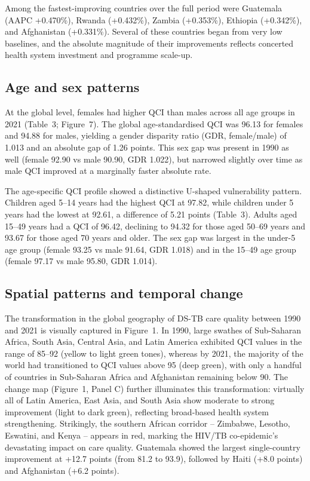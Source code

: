 \documentclass[12pt]{article}
\begin{document}
Among the fastest-improving countries over the full period were Guatemala (AAPC +0.470\%), Rwanda (+0.432\%), Zambia (+0.353\%), Ethiopia (+0.342\%), and Afghanistan (+0.331\%). Several of these countries began from very low baselines, and the absolute magnitude of their improvements reflects concerted health system investment and programme scale-up.

\subsection{Age and sex patterns}

At the global level, females had higher QCI than males across all age groups in 2021 (Table~3; Figure~7). The global age-standardised QCI was 96.13 for females and 94.88 for males, yielding a gender disparity ratio (GDR, female/male) of 1.013 and an absolute gap of 1.26 points. This sex gap was present in 1990 as well (female 92.90 vs male 90.90, GDR 1.022), but narrowed slightly over time as male QCI improved at a marginally faster absolute rate.

The age-specific QCI profile showed a distinctive U-shaped vulnerability pattern. Children aged 5--14 years had the highest QCI at 97.82, while children under 5 years had the lowest at 92.61, a difference of 5.21 points (Table~3). Adults aged 15--49 years had a QCI of 96.42, declining to 94.32 for those aged 50--69 years and 93.67 for those aged 70 years and older. The sex gap was largest in the under-5 age group (female 93.25 vs male 91.64, GDR 1.018) and in the 15--49 age group (female 97.17 vs male 95.80, GDR 1.014).

\subsection{Spatial patterns and temporal change}

The transformation in the global geography of DS-TB care quality between 1990 and 2021 is visually captured in Figure~1. In 1990, large swathes of Sub-Saharan Africa, South Asia, Central Asia, and Latin America exhibited QCI values in the range of 85--92 (yellow to light green tones), whereas by 2021, the majority of the world had transitioned to QCI values above 95 (deep green), with only a handful of countries in Sub-Saharan Africa and Afghanistan remaining below 90. The change map (Figure~1, Panel C) further illuminates this transformation: virtually all of Latin America, East Asia, and South Asia show moderate to strong improvement (light to dark green), reflecting broad-based health system strengthening. Strikingly, the southern African corridor -- Zimbabwe, Lesotho, Eswatini, and Kenya -- appears in red, marking the HIV/TB co-epidemic's devastating impact on care quality. Guatemala showed the largest single-country improvement at +12.7 points (from 81.2 to 93.9), followed by Haiti (+8.0 points) and Afghanistan (+6.2 points).
\end{document}
